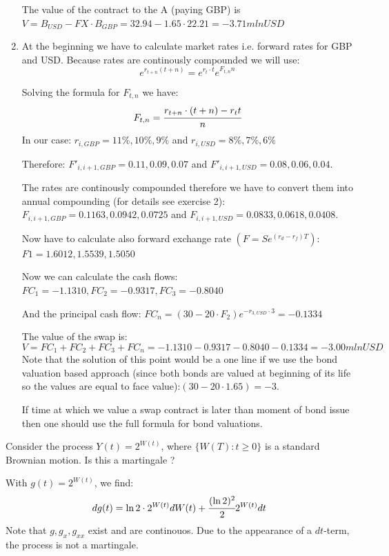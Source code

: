 \documentclass[12pt,a4paper]{exam}
\begin{document}
\begin{questions}
\begin{solution}
\begin{enumerate}[label=(\alph*),font=\itshape]
The value of the contract to the A (paying GBP) is $V=B_{USD}-FX\cdot B_{GBP}=32.94-1.65\cdot22.21=-3.71 mln USD$
\item At the beginning we have to calculate market rates i.e. forward rates for GBP and USD. Because rates are continously compounded we will use:
\begin{equation*}
e^{r_{t+n}(t+n)}=e^{r_t\cdot t}e^{F_{t, n}n}
\end{equation*}

Solving the formula for $F_{t, n}$ we have:
\begin{equation*}
F_{t, n}=\cfrac{r_{t+n}\cdot(t+n)-r_t t}{n}
\end{equation*}
In our case:
$r_{i,GBP}=11\%,10\%,9\%$ and $r_{i,USD}=8\%,7\%,6\%$

Therefore:
$F'_{i,i+1,GBP} = 0.11,0.09,0.07$ and $F'_{i,i+1,USD} = 0.08,0.06,0.04$.

The rates are continously compounded therefore we have to convert them into annual compounding (for details see exercise 2):
$F_{i,i+1,GBP}=0.1163,0.0942,0.0725$ and $F_{i, i+1,USD}=0.0833,0.0618,0.0408$.

Now have to calculate also forward exchange rate $(F=Se^{(r_d-r_f)T})$:
$F1=1.6012,1.5539,1.5050$

Now we can calculate the cash flows:
$FC_1=-1.1310, FC_2=-0.9317, FC_3=-0.8040$

And the principal cash flow:
$FC_n=(30-20\cdot F_2)e^{-r_{3,USD}\cdot 3} = -0.1334$

The value of the swap is:
\begin{equation*}
V=FC_1+FC_2+FC_3+FC_n=-1.1310-0.9317-0.8040-0.1334=-3.00 mlnUSD
\end{equation*}
Note that the solution of this point would be a one line if we use the bond valuation based approach (since both bonds are valued at beginning of its life so the values are equal to face value):$(30-20\cdot 1.65)=-3$.

If time at which we value a swap contract is later than moment of bond issue then one should use the full formula for bond valuations.
\end{enumerate}
\end{solution}


\question Consider the process $Y(t) = 2^{W(t)}$, where $\{W(T):t\geq 0\}$ is a standard Brownian motion. Is this a martingale ?
\fillwithlines{3cm}
\begin{solution}
With $g(t)=2^{W(t)}$, we find:
\begin{equation*}
dg(t) = \ln2\cdot 2^{W(t)}dW(t) +\cfrac{(\ln2)^2}{2}2^{W(t)}dt
\end{equation*}
Note that $g, g_{x}, g_{xx}$ exist and are continouos. 
Due to the appearance of a $dt$-term, the process is not a martingale.
\end{solution}


\end{questions}
\end{document}
